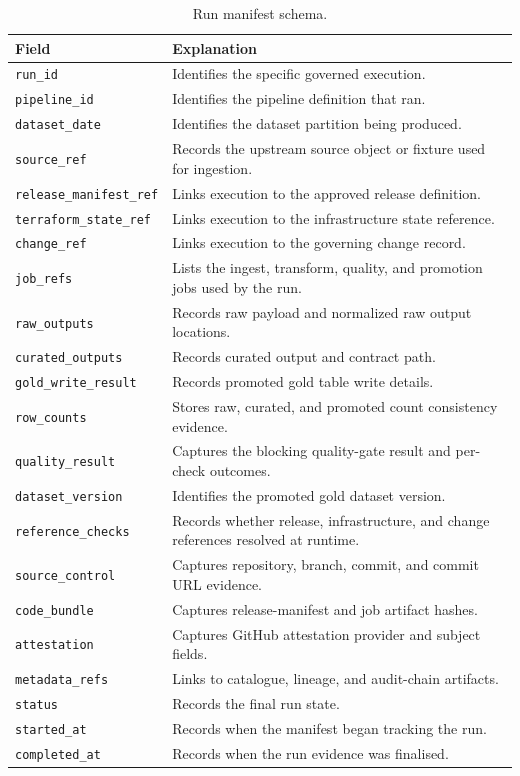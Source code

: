 \begin{table}[H]
  \centering
  \caption{Run manifest schema.}
  \label{tab:schema-run-manifest}
  \renewcommand{\arraystretch}{1.12}
  \begin{tabularx}{\textwidth}{@{}p{}X@{}}
    \toprule
    \textbf{Field} & \textbf{Explanation} \\
    \midrule
    \texttt{run\_id} & Identifies the specific governed execution. \\
    \texttt{pipeline\_id} & Identifies the pipeline definition that ran. \\
    \texttt{dataset\_date} & Identifies the dataset partition being produced. \\
    \texttt{source\_ref} & Records the upstream source object or fixture used for ingestion. \\
    \texttt{release\_manifest\_ref} & Links execution to the approved release definition. \\
    \texttt{terraform\_state\_ref} & Links execution to the infrastructure state reference. \\
    \texttt{change\_ref} & Links execution to the governing change record. \\
    \texttt{job\_refs} & Lists the ingest, transform, quality, and promotion jobs used by the run. \\
    \texttt{raw\_outputs} & Records raw payload and normalized raw output locations. \\
    \texttt{curated\_outputs} & Records curated output and contract path. \\
    \texttt{gold\_write\_result} & Records promoted gold table write details. \\
    \texttt{row\_counts} & Stores raw, curated, and promoted count consistency evidence. \\
    \texttt{quality\_result} & Captures the blocking quality-gate result and per-check outcomes. \\
    \texttt{dataset\_version} & Identifies the promoted gold dataset version. \\
    \texttt{reference\_checks} & Records whether release, infrastructure, and change references resolved at runtime. \\
    \texttt{source\_control} & Captures repository, branch, commit, and commit URL evidence. \\
    \texttt{code\_bundle} & Captures release-manifest and job artifact hashes. \\
    \texttt{attestation} & Captures GitHub attestation provider and subject fields. \\
    \texttt{metadata\_refs} & Links to catalogue, lineage, and audit-chain artifacts. \\
    \texttt{status} & Records the final run state. \\
    \texttt{started\_at} & Records when the manifest began tracking the run. \\
    \texttt{completed\_at} & Records when the run evidence was finalised. \\
    \bottomrule
  \end{tabularx}
\end{table}

